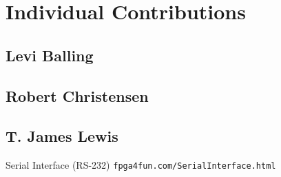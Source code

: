 \documentclass{article}
\begin{document}
\section{Individual Contributions}

\subsection{Levi Balling}

\subsection{Robert Christensen}

\subsection{T. James Lewis}

\begin{thebibliography}{99}

 Serial Interface (RS-232) \texttt{fpga4fun.com/SerialInterface.html}

\end{thebibliography}
\end{document}
